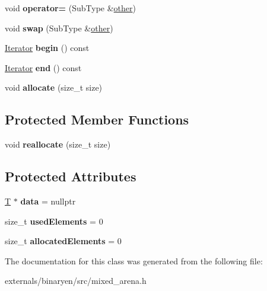 \begin{DoxyCompactItemize}
\mbox{\label{class_arena_vector_base_af4010153f3a5aa5840e96f405e4a69d0}} 
void {\bfseries operator=} (Sub\+Type \&\mbox{\hyperlink{structother}{other}})
\item 
\mbox{\label{class_arena_vector_base_aba5b2cea3aea35d0a041a881d88f092c}} 
void {\bfseries swap} (Sub\+Type \&\mbox{\hyperlink{structother}{other}})
\item 
\mbox{\label{class_arena_vector_base_a88dadb3c861ec1d6487abcab0cb53457}} 
\mbox{\hyperlink{struct_arena_vector_base_1_1_iterator}{Iterator}} {\bfseries begin} () const
\item 
\mbox{\label{class_arena_vector_base_ab0345fed1f1ee329506b770f5acad0e2}} 
\mbox{\hyperlink{struct_arena_vector_base_1_1_iterator}{Iterator}} {\bfseries end} () const
\item 
\mbox{\label{class_arena_vector_base_aa0a6d7b6d55ed5ab188698c0c1ccefbf}} 
void {\bfseries allocate} (size\+\_\+t size)
\end{DoxyCompactItemize}
\subsection*{Protected Member Functions}
\begin{DoxyCompactItemize}
\item 
\mbox{\label{class_arena_vector_base_ade73d88da378614cbaff0361cf72b302}} 
void {\bfseries reallocate} (size\+\_\+t size)
\end{DoxyCompactItemize}
\subsection*{Protected Attributes}
\begin{DoxyCompactItemize}
\item 
\mbox{\label{class_arena_vector_base_af39c0a4ba6590f0586c5b2204a6cb69b}} 
\mbox{\hyperlink{struct_t}{T}} $\ast$ {\bfseries data} = nullptr
\item 
\mbox{\label{class_arena_vector_base_af73c3ca727ab94854c76591268b1556f}} 
size\+\_\+t {\bfseries used\+Elements} = 0
\item 
\mbox{\label{class_arena_vector_base_a4d7f90654a06c53e70ffd6f7c4bbf29b}} 
size\+\_\+t {\bfseries allocated\+Elements} = 0
\end{DoxyCompactItemize}


The documentation for this class was generated from the following file\+:\begin{DoxyCompactItemize}
\item 
externals/binaryen/src/mixed\+\_\+arena.\+h\end{DoxyCompactItemize}
